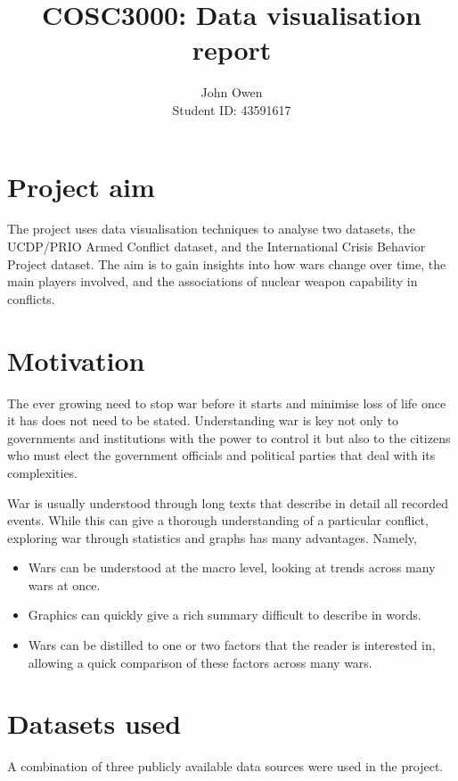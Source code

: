 \documentclass[12pt,parskip=half-]{scrartcl}
\title{COSC3000: Data visualisation report}
\author{John Owen\\Student ID: 43591617}
\date{}
\begin{document}
\maketitle

\section{Project aim}

The project uses data visualisation techniques to analyse two datasets, the
UCDP/PRIO Armed Conflict dataset, and the International Crisis Behavior Project
dataset. The aim is to gain insights into how wars change over time, the main
players involved, and the associations of nuclear weapon capability in
conflicts.

\section{Motivation}

The ever growing need to stop war before it starts and minimise loss of life
once it has does not need to be stated. Understanding war is key not only to
governments and institutions with the power to control it but also to the
citizens who must elect the government officials and political parties
that deal with its complexities.

War is usually understood through long texts that describe in detail all
recorded events. While this can give a thorough understanding of a particular
conflict, exploring war through statistics and graphs has many advantages.
Namely,

\begin{itemize}
    \item Wars can be understood at the macro level, looking at trends across
        many wars at once.
    \item Graphics can quickly give a rich summary difficult to describe in
        words.
    \item Wars can be distilled to one or two factors that the reader is
        interested in, allowing a quick comparison of these factors across many
        wars.
\end{itemize}

\section{Datasets used}

A combination of three publicly available data sources were used in the
project.
\end{document}
